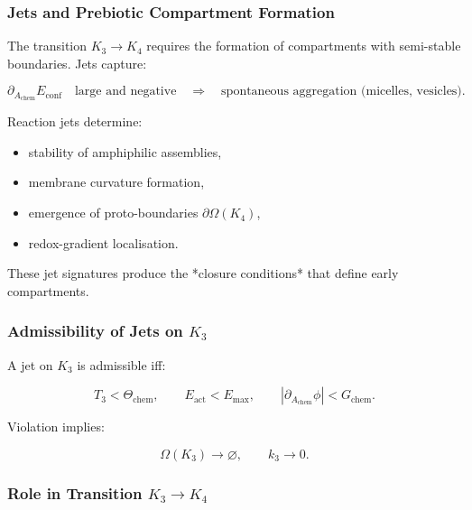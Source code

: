 \subsubsection{Jets and Prebiotic Compartment Formation}

The transition $K_3\to K_4$ requires the formation of compartments with
semi-stable boundaries. Jets capture:

\[
\partial_{A_{\mathrm{chem}}}E_{\mathrm{conf}}
\quad\text{large and negative}
\quad\Longrightarrow\quad
\text{spontaneous aggregation (micelles, vesicles)}.
\]

Reaction jets determine:

\begin{itemize}
    \item stability of amphiphilic assemblies,
    \item membrane curvature formation,
    \item emergence of proto-boundaries $\partial\Omega(K_4)$,
    \item redox-gradient localisation.
\end{itemize}

These jet signatures produce the *closure conditions* that define early
compartments.



\subsubsection{Admissibility of Jets on \texorpdfstring{$K_3$}{K_3}}

A jet on $K_3$ is admissible iff:

\[
T_3 < \Theta_{\mathrm{chem}},
\qquad
E_{\mathrm{act}} < E_{\max},
\qquad
|\partial_{A_{\mathrm{chem}}}\phi| < G_{\mathrm{chem}}.
\]

Violation implies:

\[
\Omega(K_3)\to\varnothing,
\qquad
k_3\to 0.
\]



\subsubsection{Role in Transition \texorpdfstring{\texorpdfstring{$K_3\to K_4$}{K_3\to K_4}}{K3→K4}}

